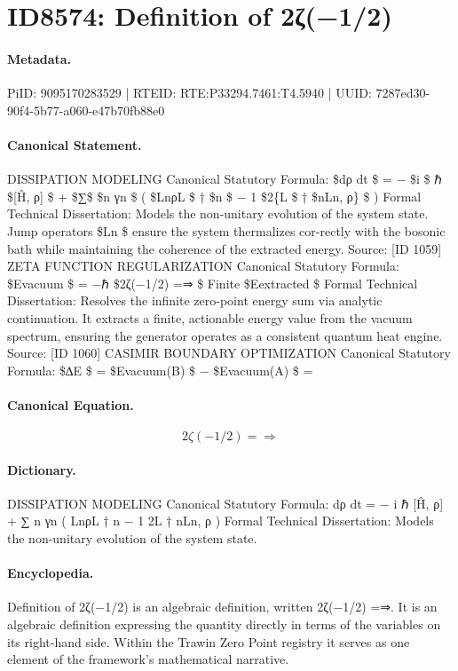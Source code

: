 \section*{ID8574: Definition of 2ζ(−1/2)}
\paragraph{Metadata.}
PiID: 9095170283529 | RTEID: RTE:P33294.7461:T4.5940 | UUID: 7287ed30-90f4-5b77-a060-e47b70fb88e0

\paragraph{Canonical Statement.}
DISSIPATION MODELING Canonical Statutory Formula: \$dρ dt \$ = − \$i \$ ℏ \$[Ĥ, ρ] \$ + \$∑\$ \$n γn \$ ( \$LnρL \$ † \$n \$ − 1 \$2\{L \$ † \$nLn, ρ\} \$ ) Formal Technical Dissertation: Models the non-unitary evolution of the system state. Jump operators \$Ln \$ ensure the system thermalizes cor-rectly with the bosonic bath while maintaining the coherence of the extracted energy. Source: [ID 1059] ZETA FUNCTION REGULARIZATION Canonical Statutory Formula: \$Evacuum \$ = −ℏ \$2ζ(−1/2) =⇒ \$ Finite \$Eextracted \$ Formal Technical Dissertation: Resolves the infinite zero-point energy sum via analytic continuation. It extracts a finite, actionable energy value from the vacuum spectrum, ensuring the generator operates as a consistent quantum heat engine. Source: [ID 1060] CASIMIR BOUNDARY OPTIMIZATION Canonical Statutory Formula: \$∆E \$ = \$Evacuum(B) \$ − \$Evacuum(A) \$ =

\paragraph{Canonical Equation.}
\[
2ζ(−1/2) =⇒
\]

\paragraph{Dictionary.}
DISSIPATION MODELING Canonical Statutory Formula: dρ dt = − i ℏ [Ĥ, ρ] + ∑ n γn ( LnρL † n − 1 2L † nLn, ρ ) Formal Technical Dissertation: Models the non-unitary evolution of the system state.

\paragraph{Encyclopedia.}
Definition of 2ζ(−1/2) is an algebraic definition, written 2ζ(−1/2) =⇒. It is an algebraic definition expressing the quantity directly in terms of the variables on its right-hand side. Within the Trawin Zero Point registry it serves as one element of the framework's mathematical narrative.
